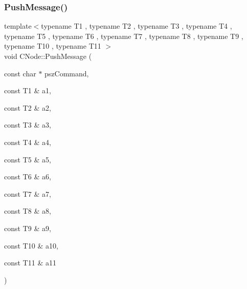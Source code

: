 \subsubsection{\texorpdfstring{Push\+Message()}{PushMessage()}\hspace{0.1cm}{\footnotesize\ttfamily [12/13]}}
{\footnotesize\ttfamily template$<$typename T1 , typename T2 , typename T3 , typename T4 , typename T5 , typename T6 , typename T7 , typename T8 , typename T9 , typename T10 , typename T11 $>$ \\
void C\+Node\+::\+Push\+Message (\begin{DoxyParamCaption}\item[{const char $\ast$}]{psz\+Command,  }\item[{const T1 \&}]{a1,  }\item[{const T2 \&}]{a2,  }\item[{const T3 \&}]{a3,  }\item[{const T4 \&}]{a4,  }\item[{const T5 \&}]{a5,  }\item[{const T6 \&}]{a6,  }\item[{const T7 \&}]{a7,  }\item[{const T8 \&}]{a8,  }\item[{const T9 \&}]{a9,  }\item[{const T10 \&}]{a10,  }\item[{const T11 \&}]{a11 }\end{DoxyParamCaption})\hspace{0.3cm}{\ttfamily [inline]}}

\mbox{\label{class_c_node_a9e9e15c8ba33b19041cbf2c2ffdbe9ab}} 
